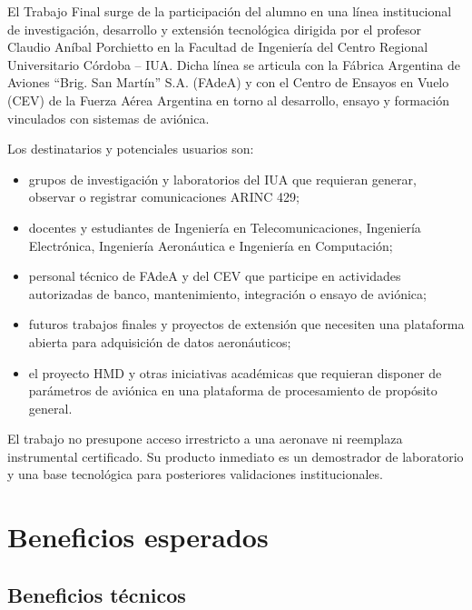 \documentclass[12pt,a4paper,oneside]{article}
\begin{document}
El Trabajo Final surge de la participación del alumno en una línea institucional de investigación, desarrollo y extensión tecnológica dirigida por el profesor Claudio Aníbal Porchietto en la Facultad de Ingeniería del Centro Regional Universitario Córdoba -- IUA. Dicha línea se articula con la Fábrica Argentina de Aviones ``Brig. San Martín'' S.A. (FAdeA) y con el Centro de Ensayos en Vuelo (CEV) de la Fuerza Aérea Argentina en torno al desarrollo, ensayo y formación vinculados con sistemas de aviónica.

Los destinatarios y potenciales usuarios son:

\begin{itemize}
  \item grupos de investigación y laboratorios del IUA que requieran generar, observar o registrar comunicaciones ARINC 429;
  \item docentes y estudiantes de Ingeniería en Telecomunicaciones, Ingeniería Electrónica, Ingeniería Aeronáutica e Ingeniería en Computación;
  \item personal técnico de FAdeA y del CEV que participe en actividades autorizadas de banco, mantenimiento, integración o ensayo de aviónica;
  \item futuros trabajos finales y proyectos de extensión que necesiten una plataforma abierta para adquisición de datos aeronáuticos;
  \item el proyecto HMD y otras iniciativas académicas que requieran disponer de parámetros de aviónica en una plataforma de procesamiento de propósito general.
\end{itemize}

El trabajo no presupone acceso irrestricto a una aeronave ni reemplaza instrumental certificado. Su producto inmediato es un demostrador de laboratorio y una base tecnológica para posteriores validaciones institucionales.

\section{Beneficios esperados}

\subsection{Beneficios técnicos}
\end{document}
